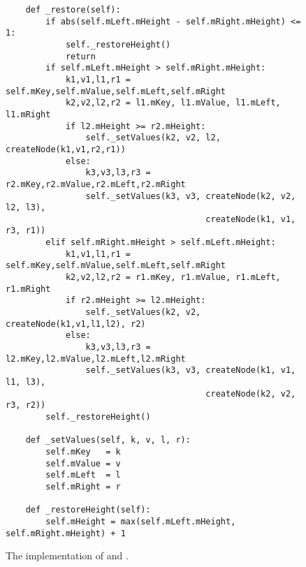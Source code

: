 \begin{figure}[!ht]
\centering
\begin{verbatim}
    def _restore(self):
        if abs(self.mLeft.mHeight - self.mRight.mHeight) <= 1:
            self._restoreHeight()
            return
        if self.mLeft.mHeight > self.mRight.mHeight:
            k1,v1,l1,r1 = self.mKey,self.mValue,self.mLeft,self.mRight
            k2,v2,l2,r2 = l1.mKey, l1.mValue, l1.mLeft, l1.mRight
            if l2.mHeight >= r2.mHeight:
                self._setValues(k2, v2, l2, createNode(k1,v1,r2,r1))
            else: 
                k3,v3,l3,r3 = r2.mKey,r2.mValue,r2.mLeft,r2.mRight
                self._setValues(k3, v3, createNode(k2, v2, l2, l3),
                                        createNode(k1, v1, r3, r1))
        elif self.mRight.mHeight > self.mLeft.mHeight:
            k1,v1,l1,r1 = self.mKey,self.mValue,self.mLeft,self.mRight
            k2,v2,l2,r2 = r1.mKey, r1.mValue, r1.mLeft, r1.mRight
            if r2.mHeight >= l2.mHeight:
                self._setValues(k2, v2, createNode(k1,v1,l1,l2), r2)
            else:
                k3,v3,l3,r3 = l2.mKey,l2.mValue,l2.mLeft,l2.mRight
                self._setValues(k3, v3, createNode(k1, v1, l1, l3),
                                        createNode(k2, v2, r3, r2))
        self._restoreHeight()
    
    def _setValues(self, k, v, l, r):
        self.mKey   = k
        self.mValue = v
        self.mLeft  = l
        self.mRight = r
    
    def _restoreHeight(self):
        self.mHeight = max(self.mLeft.mHeight, self.mRight.mHeight) + 1
\end{verbatim}
\vspace*{-0.3cm}
\caption{The implementation of  and .}
\label{fig:avl-tree.ipython:restore}
\end{figure}


